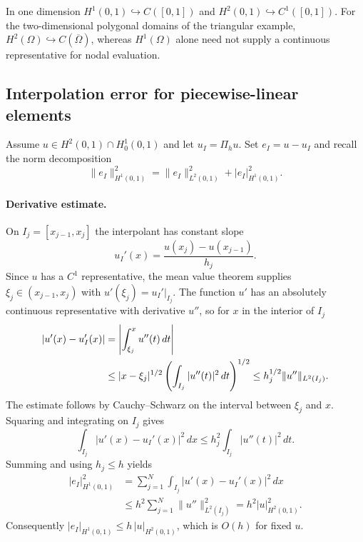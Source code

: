 \documentclass[11pt,a4paper]{article}
\begin{document}
In one dimension \(H^1(0,1)\hookrightarrow C([0,1])\) and \(H^2(0,1)\hookrightarrow C^1([0,1])\). For the two-dimensional polygonal domains of the triangular example, \(H^2(\Omega)\hookrightarrow C(\overline\Omega)\), whereas \(H^1(\Omega)\) alone need not supply a continuous representative for nodal evaluation.

\subsection{Interpolation error for piecewise-linear elements}

Assume \(u\in H^2(0,1)\cap H_0^1(0,1)\) and let \(u_I=\Pi_hu\). Set \(e_I=u-u_I\) and recall the norm decomposition
\[
 \|e_I\|_{H^1(0,1)}^2
     =\|e_I\|_{L^2(0,1)}^2+|e_I|_{H^1(0,1)}^2.
\]

\paragraph{Derivative estimate.}
On \(I_j=[x_{j-1},x_j]\) the interpolant has constant slope
\[
 u_I'(x)=\frac{u(x_j)-u(x_{j-1})}{h_j}.
\]
Since \(u\) has a \(C^1\) representative, the mean value theorem supplies \(\xi_j\in(x_{j-1},x_j)\) with \(u'(\xi_j)=u_I'|_{I_j}\). The function \(u'\) has an absolutely continuous representative with derivative \(u''\), so for \(x\) in the interior of \(I_j\)
\begin{align}
 |u'(x)-u_I'(x)|
 &=\left|\int_{\xi_j}^x u''(t)\,dt\right|\notag\\
 &\le |x-\xi_j|^{1/2}
       \left(\int_{I_j}|u''(t)|^2\,dt\right)^{1/2}
 \le h_j^{1/2}\|u''\|_{L^2(I_j)}.
 \label{eq:781-l15-interp-pointwise}
\end{align}
The estimate follows by Cauchy--Schwarz on the interval between \(\xi_j\) and \(x\). Squaring and integrating on \(I_j\) gives
\[
 \int_{I_j}|u'(x)-u_I'(x)|^2\,dx
       \le h_j^2\int_{I_j}|u''(t)|^2\,dt .
\]
Summing and using \(h_j\le h\) yields
\begin{align*}
 |e_I|_{H^1(0,1)}^2
    &=\sum_{j=1}^{N}\int_{I_j}|u'(x)-u_I'(x)|^2\,dx\\
    &\le h^2\sum_{j=1}^{N}\|u''\|_{L^2(I_j)}^2
     =h^2|u|_{H^2(0,1)}^2 .
\end{align*}
Consequently \(|e_I|_{H^1(0,1)}\le h\,|u|_{H^2(0,1)}\), which is \(O(h)\) for fixed \(u\).

\pagebreak[4]
\end{document}
